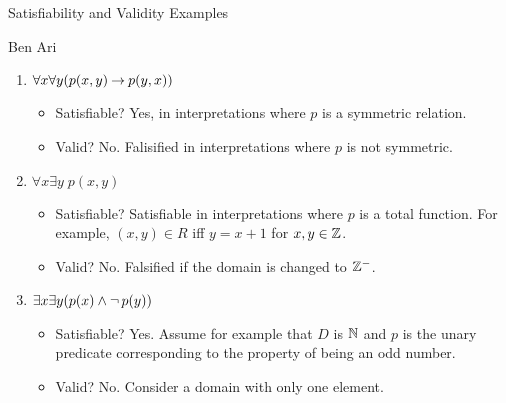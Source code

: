 \begin{wideslide}[bm=,toc=]{Satisfiability and Validity Examples}
\begin{defn}{7.25}{Ben Ari}
\end{defn}
\begin{enumerate}
\item<2-> $\forall x \forall y (p(x,y) \mathbin{\rightarrow} p(y,x))$
\begin{itemize}
\item<3-> Satisfiable? \pause[3] Yes, in interpretations where $p$ is a
symmetric relation.
\item<3-> Valid? \pause No. Falisified in interpretations where $p$ is
not symmetric. 
\end{itemize}
\item<6-> $\forall x \exists y \; p(x,y)$
\begin{itemize}
\item<7-> Satisfiable? \pause[3] Satisfiable in interpretations where 
$p$ is a total function. For example, $(x,y) \in R$ iff $y = x + 1$
for $x,y \in \mathbb{Z}$.
\item<7-> Valid? \pause No. Falsified if the domain is changed to $\mathbb{Z}^-$.  
\end{itemize}
\item<10-> $\exists x \exists y(p(x) \land \mathop{\neg} p (y))$
\begin{itemize}
\item<11-> Satisfiable? \pause[3] Yes. Assume for example that $D$ is $\mathbb{N}$ and
$p$ is the unary predicate corresponding to the property of being an
odd number.
\item<11-> Valid? \pause No. Consider a domain with only one element.
\end{itemize}
\end{enumerate}
\end{wideslide}

